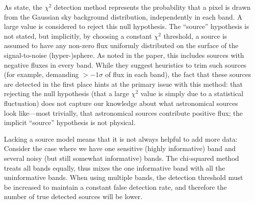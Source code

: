 \documentclass[11pt,letterpaper,linenumbers]{aastex63}
\begin{document}
As \cite{szalay1999} state, the $\chi^2$ detection method represents
the probability that a pixel is drawn from the Gaussian sky background
distribution, independently in each band.  A large value is
considered to reject this null hypothesis.  The ``source'' hypothesis
is not stated, but implicitly, by choosing a constant $\chi^2$
threshold, a source is assumed to have any non-zero flux uniformly
distributed on the surface of the signal-to-noise (hyper-)sphere.  As
noted in the paper, this includes sources with negative fluxes in
every band.  While they suggest heuristics to trim such sources (for
example, demanding $> -1 \sigma$ of flux in each band), the fact that
these sources are detected in the first place hints at the primary
issue with this method: that rejecting the null hypothesis (that a
large $\chi^2$ value is simply due to a statistical fluctuation) does
not capture our knowledge about what astronomical sources look
like---most trivially, that astronomical sources contribute positive
flux; the implicit ``source'' hypothesis is not physical.

Lacking a source model means that it is not always helpful to add more
data: Consider the case where we have one sensitive (highly
informative) band and several noisy (but still somewhat informative)
bands.  The chi-squared method treats all bands equally, thus mixes
the one informative band with all the uninformative bands.  When using
multiple bands, the detection threshold must be increased to maintain
a constant false detection rate, and therefore the number of true
detected sources will be lower.
\end{document}
